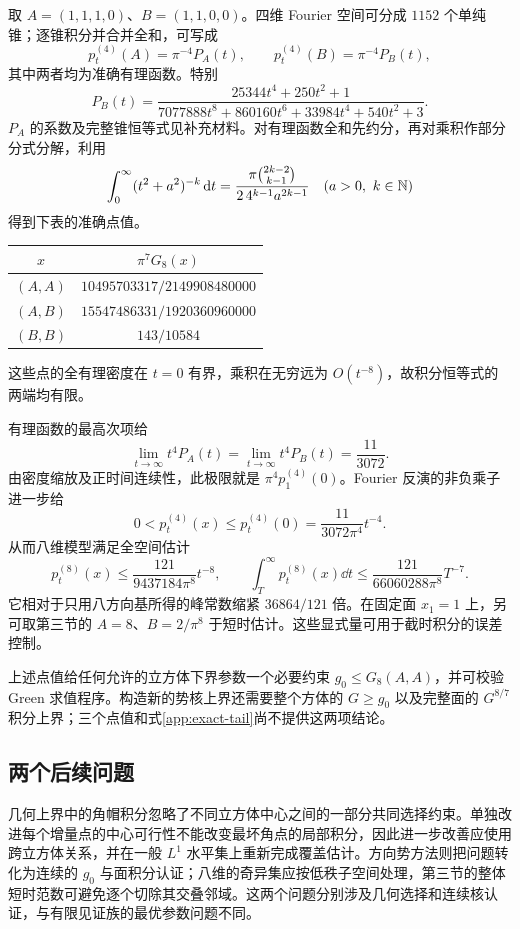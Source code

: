 取 $A=(1,1,1,0)$、$B=(1,1,0,0)$。四维 Fourier 空间可分成 $1152$ 个单纯锥；逐锥积分并合并全和，可写成
\[
 p_t^{(4)}(A)=\pi^{-4}P_A(t),\qquad
 p_t^{(4)}(B)=\pi^{-4}P_B(t),
\]
其中两者均为准确有理函数。特别
\begin{equation}\label{app:PB}
 P_B(t)=\frac{25344t^4+250t^2+1}
 {7077888t^8+860160t^6+33984t^4+540t^2+3}.
\end{equation}
$P_A$ 的系数及完整锥恒等式见补充材料。对有理函数全和先约分，再对乘积作部分分式分解，利用
\[
 \int_0^\infty(t^2+a^2)^{-k}\,\mathrm d t
 =\frac{\pi\binom{2k-2}{k-1}}{2\,4^{k-1}a^{2k-1}}
 \quad(a>0,\ k\in\mathbb{N})
\]
得到下表的准确点值。
\begin{center}
\begin{tabular}{cc}
\toprule
$x$ & $\pi^7G_8(x)$\\
\midrule
$(A,A)$ & $10495703317/2149908480000$\\
$(A,B)$ & $15547486331/1920360960000$\\
$(B,B)$ & $143/10584$\\
\bottomrule
\end{tabular}
\end{center}
这些点的全有理密度在 $t=0$ 有界，乘积在无穷远为 $O(t^{-8})$，故积分恒等式的两端均有限。

有理函数的最高次项给
\[
 \lim_{t\to\infty}t^4P_A(t)=\lim_{t\to\infty}t^4P_B(t)
 =\frac{11}{3072}.
\]
由密度缩放及正时间连续性，此极限就是 $\pi^4p_1^{(4)}(0)$。Fourier 反演的非负乘子进一步给
\[
 0<p_t^{(4)}(x)\le p_t^{(4)}(0)
 =\frac{11}{3072\pi^4}t^{-4}.
\]
从而八维模型满足全空间估计
\begin{equation}\label{app:exact-tail}
 p_t^{(8)}(x)\le\frac{121}{9437184\pi^8}t^{-8},\qquad
 \int_T^\infty p_t^{(8)}(x)\dd t
 \le\frac{121}{66060288\pi^8}T^{-7}.
\end{equation}
它相对于只用八方向基所得的峰常数缩紧 $36864/121$ 倍。在固定面 $x_1=1$ 上，另可取第三节的 $A=8$、$B=2/\pi^8$ 于短时估计。这些显式量可用于截时积分的误差控制。

上述点值给任何允许的立方体下界参数一个必要约束
$g_0\le G_8(A,A)$，并可校验 Green 求值程序。构造新的势核上界还需要整个方体的 $G\ge g_0$ 以及完整面的 $G^{8/7}$ 积分上界；三个点值和式\eqref{app:exact-tail}尚不提供这两项结论。

\subsection{两个后续问题}
几何上界中的角帽积分忽略了不同立方体中心之间的一部分共同选择约束。单独改进每个增量点的中心可行性不能改变最坏角点的局部积分，因此进一步改善应使用跨立方体关系，并在一般 $L^1$ 水平集上重新完成覆盖估计。方向势方法则把问题转化为连续的 $g_0$ 与面积分认证；八维的奇异集应按低秩子空间处理，第三节的整体短时范数可避免逐个切除其交叠邻域。这两个问题分别涉及几何选择和连续核认证，与有限见证族的最优参数问题不同。
